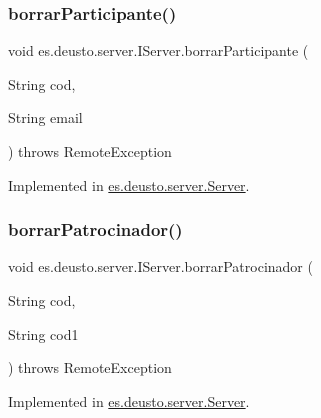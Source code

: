 \mbox{\label{interfacees_1_1deusto_1_1server_1_1_i_server_ac833d9018ade9c49677942317f270046}} 
\subsubsection{\texorpdfstring{borrarParticipante()}{borrarParticipante()}}
{\footnotesize\ttfamily void es.\+deusto.\+server.\+I\+Server.\+borrar\+Participante (\begin{DoxyParamCaption}\item[{String}]{cod,  }\item[{String}]{email }\end{DoxyParamCaption}) throws Remote\+Exception}



Implemented in \mbox{\hyperlink{classes_1_1deusto_1_1server_1_1_server_a60cba3edcdffc7f50d4fa1f55b54ce76}{es.\+deusto.\+server.\+Server}}.

\mbox{\label{interfacees_1_1deusto_1_1server_1_1_i_server_a14b52d5f2c1410736c6d74c65a479813}} 
\subsubsection{\texorpdfstring{borrarPatrocinador()}{borrarPatrocinador()}}
{\footnotesize\ttfamily void es.\+deusto.\+server.\+I\+Server.\+borrar\+Patrocinador (\begin{DoxyParamCaption}\item[{String}]{cod,  }\item[{String}]{cod1 }\end{DoxyParamCaption}) throws Remote\+Exception}



Implemented in \mbox{\hyperlink{classes_1_1deusto_1_1server_1_1_server_a0110ad2da18e4867bdc3321fb3871f7a}{es.\+deusto.\+server.\+Server}}.

\mbox{\label{interfacees_1_1deusto_1_1server_1_1_i_server_a816dca404c8d1fb6e414a74cbfcdf08e}} 
